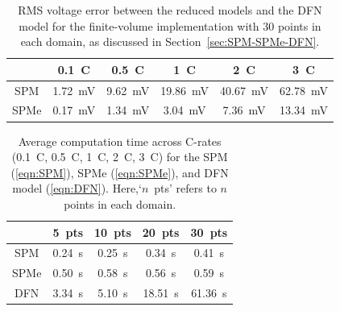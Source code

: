 \documentclass[a4paper]{article}
\begin{document}
\begin{table}[h]
  \centering
  \begin{tabular}{c c c c c c}
    \toprule
    & \SI{0.1}{C} & \SI{0.5}{C} & \SI{1}{C} & \SI{2}{C} & \SI{3}{C} \\
    \midrule
    SPM & \SI{1.72}{mV} & \SI{9.62}{mV} & \SI{19.86}{mV} & \SI{40.67}{mV} & \SI{62.78}{mV} \\
    SPMe & \SI{0.17}{mV} & \SI{1.34}{mV} & \SI{3.04}{mV} & \SI{7.36}{mV} & \SI{13.34}{mV} \\
    \bottomrule
  \end{tabular}
  \caption{RMS voltage error between the reduced models and the DFN model for the finite-volume implementation with 30 points in each domain, as discussed in Section~\ref{sec:SPM-SPMe-DFN}.}
  \label{tab:RMSE-table}
\end{table}


\begin{table}[h]
  \centering
  \begin{tabular}{c c c c c}
    \toprule
            & 5~pts & 10~pts & 20~pts & 30~pts \\
    \midrule
      SPM   & 0.24~s & 0.25~s  & 0.34~s  & 0.41~s \\
      SPMe  & 0.50~s & 0.58~s & 0.56~s & 0.59~s \\
      DFN   & 3.34~s & 5.10~s & 18.51~s & 61.36~s \\
    \bottomrule
  \end{tabular}
    \caption{Average computation time across C-rates (0.1~C, 0.5~C, 1~C, 2~C, 3~C) for the SPM (\ref{eqn:SPM}), SPMe (\ref{eqn:SPMe}), and DFN model (\ref{eqn:DFN}). Here,`$n$~pts' refers to $n$ points in each domain.}
\end{table}
\end{document}
